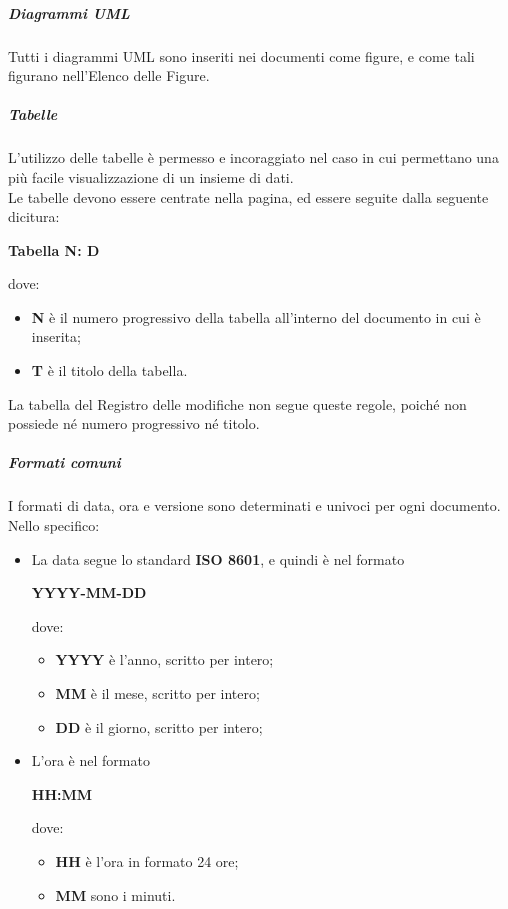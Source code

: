\documentclass[../norme-di-progetto.tex]{subfiles}
\begin{document}
\subparagraph*{Diagrammi UML}
Tutti i diagrammi UML sono inseriti nei documenti come figure, e come tali figurano nell'Elenco delle Figure.

\subparagraph*{Tabelle}
L'utilizzo delle tabelle è permesso e incoraggiato nel caso in cui permettano una più facile visualizzazione di un insieme di dati. \\
Le tabelle devono essere centrate nella pagina, ed essere seguite dalla seguente dicitura: \\ \begin{center}
  \centering
  \textbf{Tabella N: D}
\end{center} dove:
\begin{itemize}
  \item \textbf{N} è il numero progressivo della tabella all'interno del documento in cui è inserita;
  \item \textbf{T} è il titolo della tabella.
\end{itemize}
La tabella del Registro delle modifiche non segue queste regole, poiché non possiede né numero progressivo né titolo.

\subparagraph*{Formati comuni}
I formati di data, ora e versione sono determinati e univoci per ogni documento. Nello specifico:
\begin{itemize}
  \item La data segue lo standard \textbf{ISO 8601}, e quindi è nel formato \\ \begin{center}
    \centering
    \textbf{YYYY-MM-DD}
  \end{center} dove:
  \begin{itemize}
    \item \textbf{YYYY} è l'anno, scritto per intero;
    \item \textbf{MM} è il mese, scritto per intero;
    \item \textbf{DD} è il giorno, scritto per intero;
  \end{itemize}
  \item L'ora è nel formato \\ \begin{center}
  \centering
  \textbf{HH:MM}
  \end{center} dove:
  \begin{itemize}
    \item \textbf{HH} è l'ora in formato 24 ore;
    \item \textbf{MM} sono i minuti.
  \end{itemize}
\end{itemize}
\end{document}
